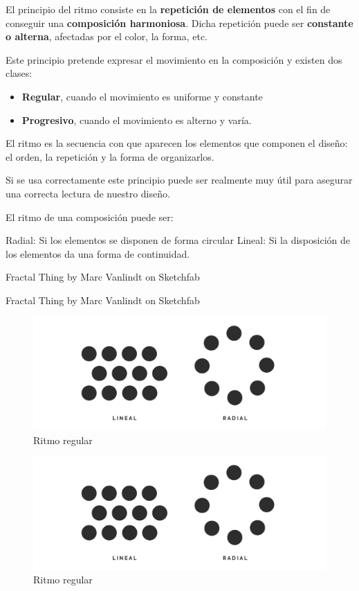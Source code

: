 \documentclass[
  16pt,
]{krantz}
\providecommand{\tightlist}{%
  \setlength{\itemsep}{0pt}\setlength{\parskip}{0pt}}
\theoremstyle{definition}
\theoremstyle{definition}
\theoremstyle{definition}
\theoremstyle{definition}
\theoremstyle{remark}
\begin{document}
El principio del ritmo consiste en la \textbf{repetición de elementos} con el fin de conseguir una \textbf{composición harmoniosa}. Dicha repetición puede ser \textbf{constante o alterna}, afectadas por el color, la forma, etc.

Este principio pretende expresar el movimiento en la composición y existen dos clases:

\begin{itemize}
\tightlist
\item
  \textbf{Regular}, cuando el movimiento es uniforme y constante
\item
  \textbf{Progresivo}, cuando el movimiento es alterno y varía.
\end{itemize}

El ritmo es la secuencia con que aparecen los elementos que componen el diseño: el orden, la repetición y la forma de organizarlos.

Si se usa correctamente este principio puede ser realmente muy útil para asegurar una correcta lectura de nuestro diseño.

El ritmo de una composición puede ser:

Radial: Si los elementos se disponen de forma circular Lineal: Si la disposición de los elementos da una forma de continuidad.

Fractal Thing by Marc Vanlindt on Sketchfab

Fractal Thing by Marc Vanlindt on Sketchfab

\begin{figure}

{\centering \includegraphics[width=1\linewidth,height=1\textheight]{ritmo} 

}

\caption{Ritmo regular}\label{fig:ritmo}
\end{figure}

\begin{figure}

{\centering \includegraphics[width=1\linewidth,height=1\textheight]{ritmo} 

}

\caption{Ritmo regular}\label{fig:rythm}
\end{figure}
\end{document}
